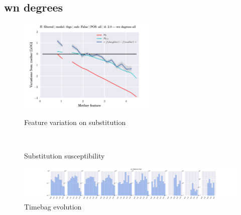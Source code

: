 \subsection{wn degrees}
\begin{figure}[h!]
    \centering
    \includegraphics[width=0.6\textwidth]{images/feature-cards/wn_degrees/feature_variations.png}
    \caption{Feature variation on substitution}
	~
	\caption{Substitution susceptibility}
    \includegraphics[width=\textwidth]{images/feature-cards/wn_degrees/timebags_evolution-hist.png}
	\caption{Timebag evolution}
\end{figure}


\clearpage
